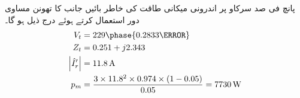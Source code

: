 پانچ فی صد سرکاو پر اندرونی میکانی طاقت کی خاطر بائیں جانب کا تھونن مساوی دور استعمال کرتے ہوئے  درج ذیل ہو گا۔
\begin{align*}
V_t&=229 \phase{0.2833 \degree}\\
Z_t&=0.251+j2.343\\
\abs{\hat{I}_r'}&=\SI{11.8}{\ampere}\\
p_m&=\frac{3 \times 11.8^2 \times 0.974 \times (1-0.05)}{0.05}=\SI{7730}{\watt}
\end{align*}
